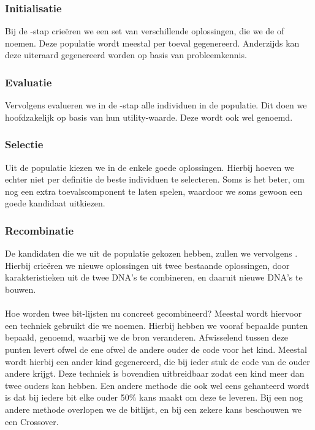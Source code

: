 \subsubsection{Initialisatie} Bij de -stap crieëren we een set van verschillende oplossingen, die we de  of  noemen. Deze populatie wordt meestal per toeval gegenereerd. Anderzijds kan deze uiteraard gegenereerd worden op basis van probleemkennis.
\subsubsection{Evaluatie}Vervolgens evalueren we in de -stap alle individuen in de populatie. Dit doen we hoofdzakelijk op basis van hun utility-waarde. Deze wordt ook wel  genoemd.
\subsubsection{Selectie}Uit de populatie kiezen we in de  enkele goede oplossingen. Hierbij hoeven we echter niet per definitie de beste individuen te selecteren. Soms is het beter, om nog een extra toevalscomponent te laten spelen, waardoor we soms gewoon een goede kandidaat uitkiezen.
\subsubsection{Recombinatie}De kandidaten die we uit de populatie gekozen hebben, zullen we vervolgens . Hierbij crieëren we nieuwe oplossingen uit twee bestaande oplossingen, door karakteristieken uit de twee DNA's te combineren, en daaruit nieuwe DNA's te bouwen.
\paragraph{}
Hoe worden twee bit-lijsten nu concreet gecombineerd? Meestal wordt hiervoor een techniek gebruikt die we  noemen. Hierbij hebben we vooraf bepaalde punten bepaald,  genoemd, waarbij we de bron veranderen. Afwisselend tussen deze punten levert ofwel de ene ofwel de andere ouder de code voor het kind. Meestal wordt hierbij een ander kind gegenereerd, die bij ieder stuk de code van de ouder andere krijgt. Deze techniek is bovendien uitbreidbaar zodat een kind meer dan twee ouders kan hebben. Een andere methode die ook wel eens gehanteerd wordt is dat bij iedere bit elke ouder 50\% kans maakt om deze te leveren. Bij een nog andere methode overlopen we de bitlijst, en bij een zekere kans beschouwen we een Crossover.
